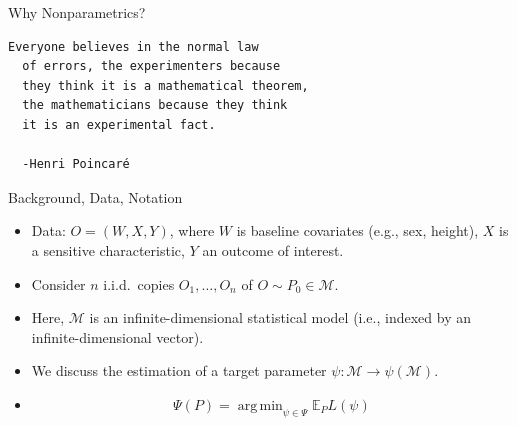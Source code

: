 \documentclass[12pt,t,handout]{beamer}
\newcommand{\E}{\mathbb{E}}
\DeclareMathOperator*{\argmin}{arg\,min}
\begin{document}

\begin{frame}[fragile,c]{Why Nonparametrics?}

\begin{center}
\begin{minipage}[c]{10.7cm}
\begin{semiverbatim}
\lstset{basicstyle=\normalsize}
\begin{lstlisting}[linewidth=10.7cm]
  Everyone believes in the normal law
  of errors, the experimenters because
  they think it is a mathematical theorem,
  the mathematicians because they think
  it is an experimental fact.

  -Henri Poincaré
\end{lstlisting}
\end{semiverbatim}
\end{minipage}
\end{center}


\end{frame}


\begin{frame}[c]{Background, Data, Notation}

\begin{center}
\begin{itemize}
  \itemsep12pt
  \item Data: $O = (W, X, Y)$, where $W$ is baseline covariates (e.g., sex,
    height), $X$ is a sensitive characteristic, $Y$ an outcome of interest.
  \item Consider $n$ i.i.d.~copies $O_1, \dots, O_n$ of $O \sim P_0 \in
    \mathcal{M}$.
  \item Here, $\mathcal{M}$ is an infinite-dimensional statistical model (i.e.,
    indexed by an infinite-dimensional vector).
  \item We discuss the estimation of a target parameter $\psi : \mathcal{M}
    \rightarrow \psi(\mathcal{M})$.
  \item $$ \Psi(P) = \argmin_{\psi \in \Psi} \E_PL(\psi)$$
\end{itemize}
\end{center}


\end{frame}
\end{document}
